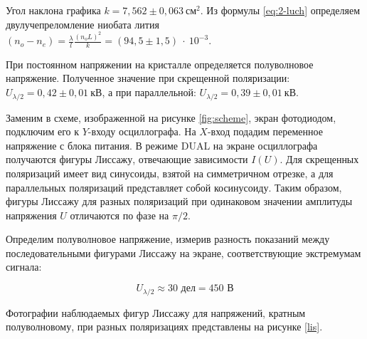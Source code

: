 \documentclass[a4paper, 12pt]{article}
\begin{document}
Угол наклона графика $k = 7,562\pm0,063~см^2$. Из формулы \eqref{eq:2-luch} определяем двулучепреломление ниобата лития $(n_o - n_e) = \frac{\lambda}{l}\frac{(n_o L)^2}{k} = (94,5\pm1,5)~\cdot~10^{-3}$.

\newpage

При постоянном напряжении на кристалле определяется полуволновое напряжение. Полученное значение при скрещенной поляризации: $U_{\lambda/2} = 0,42\pm0,01~кВ$, а при параллельной: $U_{\lambda/2} = 0,39\pm0,01~кВ$.

Заменим в схеме, изображенной на рисунке \ref{fig:scheme}, экран фотодиодом, подключим его к $Y$-входу осциллографа. На $X$-вход подадим переменное напряжение с блока питания. В режиме DUAL на экране осциллографа получаются фигуры Лиссажу, отвечающие зависимости $I(U)$. Для скрещенных поляризаций имеет вид синусоиды, взятой на симметричном отрезке, а для параллельных поляризаций представляет собой косинусоиду. Таким образом, фигуры Лиссажу для разных поляризаций при одинаковом значении амплитуды напряжения $U$ отличаются по фазе на $\pi/2$.
	
Определим полуволновое напряжение, измерив разность показаний между последовательными фигурами Лиссажу на экране, соответствующие экстремумам сигнала: 
	
\[ U_{\lambda/2} \approx 30 \text{ дел} = 450 \text{ В} \]
	
Фотографии наблюдаемых фигур Лиссажу для напряжений, кратным полуволновому, при разных поляризациях представлены на рисунке \ref{lis}.
	
\end{document}
